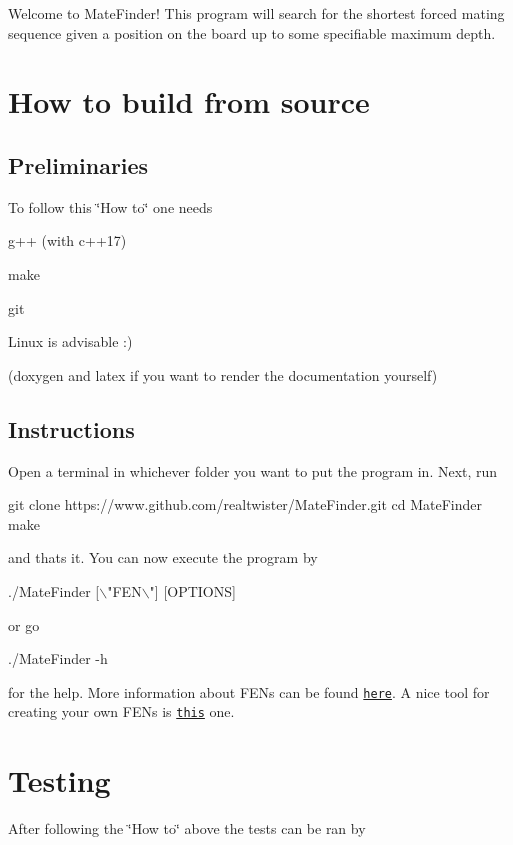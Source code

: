 Welcome to Mate\+Finder! This program will search for the shortest forced mating sequence given a position on the board up to some specifiable maximum depth.\hypertarget{index_HowTo}{}\section{How to build from source}\label{index_HowTo}
\hypertarget{index_Preliminaries}{}\subsection{Preliminaries}\label{index_Preliminaries}
To follow this \char`\"{}\+How to\char`\"{} one needs
\begin{DoxyItemize}
\item g++ (with c++17)
\item make
\item git
\item Linux is advisable \+:)
\item (doxygen and latex if you want to render the documentation yourself) 
\end{DoxyItemize}\hypertarget{index_Instructions}{}\subsection{Instructions}\label{index_Instructions}
Open a terminal in whichever folder you want to put the program in. Next, run 
\begin{DoxyCode}
git clone https://www.github.com/realtwister/MateFinder.git
cd MateFinder
make
\end{DoxyCode}
 and that\textquotesingle{}s it. You can now execute the program by 
\begin{DoxyCode}
./MateFinder [\(\backslash\)"FEN\(\backslash\)"] [OPTIONS]
\end{DoxyCode}
 or go 
\begin{DoxyCode}
./MateFinder -h
\end{DoxyCode}
 for the help. More information about F\+EN\textquotesingle{}s can be found \href{https://en.wikipedia.org/wiki/Forsyth%E2%80%93Edwards_Notation}{\tt here}. A nice tool for creating your own F\+EN\textquotesingle{}s is \href{https://en.lichess.org/editor}{\tt this} one.\hypertarget{index_Testing}{}\section{Testing}\label{index_Testing}
After following the \char`\"{}\+How to\char`\"{} above the tests can be ran by 

